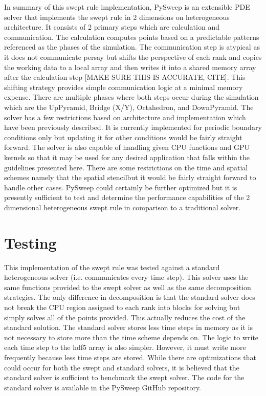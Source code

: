 \documentclass[review]{elsarticle}
\begin{document}
\par In summary of this swept rule implementation, PySweep is an extensible PDE solver that implements the swept rule in 2 dimensions on heterogeneous architecture. It consists of 2 primary steps which are calculation and communication. The calculation computes points based on a predictable patterns referenced as the phases of the simulation. The communication step is atypical as it does not communicate persay but shifts the perspective of each rank and copies the working data to a local array and then writes it into a shared memory array after the calculation step [MAKE SURE THIS IS ACCURATE, CITE]. This shifting strategy provides simple communication logic at a minimal memory expense. There are multiple phases where both steps occur during the simulation which are the UpPyramid, Bridge (X/Y), Octahedron, and DownPyramid. The solver has a few restrictions based on architecture and implementation which have been previously described. It is currently implemented for periodic boundary conditions only but updating it for other conditions would be fairly straight forward. The solver is also capable of handling given CPU functions and GPU kernels so that it may be used for any desired application that falls within the guidelines presented here. There are some restrictions on the time and spatial schemes \emdash namely that the spatial stencil\emdash but it would be fairly straight forward to handle other cases. PySweep could certainly be further optimized but it is presently sufficient to test and determine the performance capabilities of the 2 dimensional heterogeneous swept rule in comparison to a traditional solver.

\section{Testing}
This implementation of the swept rule was tested against a standard heterogeneous solver (i.e. communicates every time step). This solver uses the same functions provided to the swept solver as well as the same decomposition strategies. The only difference in decomposition is that the standard solver does not break the CPU region assigned to each rank into blocks for solving but simply solves all of the points provided. This actually reduces the cost of the standard solution. The standard solver stores less time steps in memory as it is not necessary to store more than the time scheme depends on. The logic to write each time step to the hdf5 array is also simpler. However, it must write more frequently because less time steps are stored. While there are optimizations that could occur for both the swept and standard solvers, it is believed that the standard solver is sufficient to benchmark the swept solver. The code for the standard solver is available in the PySweep GitHub repository.
\end{document}
